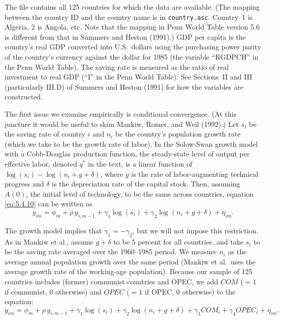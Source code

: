 \begin{problemset}
The file contains all 125 countries for which the data are available. (The mapping
between the country ID and the country name is in \texttt{country.asc}. Country~1
is Algeria, 2 is Angola, etc. Note that the mapping in Penn World Table version
5.6 is different from that in Summers and Heston (1991).) GDP per capita is the
country's real GDP converted into U.S.\ dollars using the purchasing power parity
of the country's currency against the dollar for 1985 (the variable ``RGDPCH'' in
the Penn World Table). The saving rate is measured as the ratio of real investment
to real GDP (``I'' in the Penn World Table). See Sections~II and III (particularly
III.D) of Summers and Heston (1991) for how the variables are constructed.

The first issue we examine empirically is conditional convergence. (At this
juncture it would be useful to skim Mankiw, Romer, and Weil (1992).) Let $s_i$ be
the saving rate of country $i$ and $n_i$ be the country's population growth rate (which
we take to be the growth rate of labor). In the Solow-Swan growth model with
a Cobb-Douglas production function, the steady-state level of output per effective
labor, denoted $q^*$ in the text, is a linear function of
$\log(s_i) - \log(n_i + g + \delta)$, where
$g$ is the rate of labor-augmenting technical progress and $\delta$ is the depreciation rate
of the capital stock. Then, assuming $A(0)$, the initial level of technology, to be the
same across countries, equation \eqref{eq:5.4.10} can be written as
\begin{equation}
  y_{im} = \phi_m + \rho\, y_{i,m-1} + \gamma_1 \log(s_i)
  + \gamma_2 \log(n_i + g + \delta) + \eta_{im}. \tag{1}
\end{equation}

The growth model implies that $\gamma_1 = -\gamma_2$, but we will not impose this restriction.
As in Mankiw et al., assume $g + \delta$ to be 5 percent for all countries, and take $s_i$
to be the saving rate averaged over the 1960--1985 period. We measure $n_i$ as the
average annual population growth over the same period (Mankiw et al.\ uses the
average growth rate of the working-age population). Because our sample of 125
countries includes (former) communist countries and OPEC, we add
$COM$ ($=1$ if communist, 0 otherwise) and $OPEC$ ($=1$ if OPEC, 0 otherwise) to the equation:
\begin{equation}
  y_{im} = \phi_m + \rho\, y_{i,m-1} + \gamma_1 \log(s_i)
  + \gamma_2 \log(n_i + g + \delta)
  + \gamma_3 COM_i + \gamma_4 OPEC_i + \eta_{im}. \tag{2}
\end{equation}


\end{problemset}
